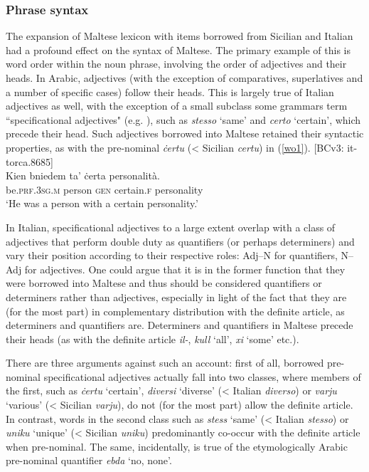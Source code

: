 \documentclass[output=paper]{langsci/langscibook}
\begin{document}
\subsubsection{Phrase syntax}
 \label{wo} %
The expansion of Maltese lexicon with items borrowed from Sicilian and Italian had a profound effect on the syntax of Maltese. The primary example of this is word order within the noun phrase, involving the order of adjectives and their heads. In Arabic, adjectives (with the exception of comparatives, superlatives and a number of specific cases) follow their heads. This is largely true of Italian adjectives as well, with the exception of a small subclass some grammars term ``specificational adjectives" (e.g. \citealt[55--56]{italian2007}), such as \textit{stesso} `same' and \textit{certo} `certain', which precede their head. Such adjectives borrowed into Maltese retained their syntactic properties, as with the pre-nominal \textit{ċertu} (< Sicilian \textit{certu}) in (\ref{wo1}).
\ea\label{wo1} 
{[BCv3: it-torca.8685]} \\
	\gll Kien bniedem ta' ċerta personalità. \\
	be.\textsc{prf.3sg.m} person \textsc{gen} certain.\textsc{f} personality\\
	\glt `He was a person with a certain personality.'\\
\z

In Italian, specificational adjectives to a large extent overlap with a class of adjectives that perform double duty as quantifiers (or perhaps determiners) and vary their position according to their respective roles: Adj--N for quantifiers, N--Adj for adjectives. One could argue that it is in the former function that they were borrowed into Maltese and thus should be considered quantifiers or determiners rather than adjectives, especially in light of the fact that they are (for the most part) in complementary distribution with the definite article, as determiners and quantifiers are. Determiners and quantifiers in Maltese precede their heads (as with the definite article \textit{il-}, \textit{kull} `all', \textit{xi} `some' etc.).

There are three arguments against such an account: first of all, borrowed pre-nominal specificational adjectives actually fall into two classes, where members of the first, such as \textit{ċertu} `certain', \textit{diversi} `diverse' (< Italian \textit{diverso}) or \textit{varju} `various' (< Sicilian \textit{varju}), do not (for the most part) allow the definite article. In contrast, words in the second class such as \textit{stess} `same' (< Italian \textit{stesso}) or \textit{uniku} `unique' (< Sicilian \textit{uniku}) predominantly co-occur with the definite article when pre-nominal. The same, incidentally, is true of the etymologically Arabic pre-nominal quantifier \textit{ebda} `no, none'.
\end{document}
